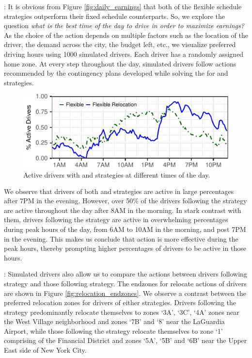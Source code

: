 : It is obvious from Figure \ref{fig:daily_earnings} that both of the flexible schedule strategies outperform their fixed schedule counterparts. So, we explore the question \textit{what is the best time of the day to drive in order to maximize earnings?} As the choice of the {\gohome} action depends on multiple factors such as the location of the driver, the demand across the city, the budget left, etc., we visualize preferred driving hours using 1000 simulated drivers. Each driver has a randomly assigned home zone. At every step throughout the day, simulated drivers follow actions recommended by the contingency plans developed while solving the {\originalproblem} for {\flexible} and {\relocationflexible} strategies.

\begin{figure}[H]
	\centering
	\includegraphics{figures/simulated_schedules.pdf}
	\caption{Active drivers with {\flexible} and {\relocationflexible}
	strategies at different times of the day.}
	\label{fig:simulated_schedules}
\end{figure}

We observe that drivers of both {\flexible} and {\relocationflexible} strategies are active in large percentages after 7PM in the evening. However, over 50\% of the drivers following the {\flexible} strategy are active throughout the day after 8AM in the morning. In stark contrast with them, drivers following the {\relocationflexible} strategy are active in overwhelming percentages during peak hours of the day, from 6AM to 10AM in the morning, and post 7PM in the evening. This makes us conclude that {\relocate} action is more effective during the peak hours, thereby prompting higher percentages of {\relocationflexible} drivers to be active in those hours.

:
Simulated drivers also allow us to compare the {\relocate} actions between drivers following {\relocation} strategy and those following {\relocationflexible} strategy. The endzones for relocate actions of drivers are shown in Figure \ref{fig:relocation_endzones}. We observe a contrast between the preferred relocation zones for drivers of either strategies. Drivers following the {\relocation} strategy predominantly relocate themselves to zones `3A', `3C', `4A' zones near the West Village neighborhood and zones `7B' and `8' near the LaGuardia Airport, while those following the {\relocationflexible} strategy relocate themselves to zone `1' comprising of the Financial District and zones `5A', `5B' and `6B' near the Upper East side of New York City.

